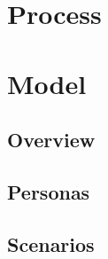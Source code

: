 \section{Process}

\pagebreak
\section{Model}

\subsection{Overview}

\subsection{Personas}

\subsection{Scenarios}